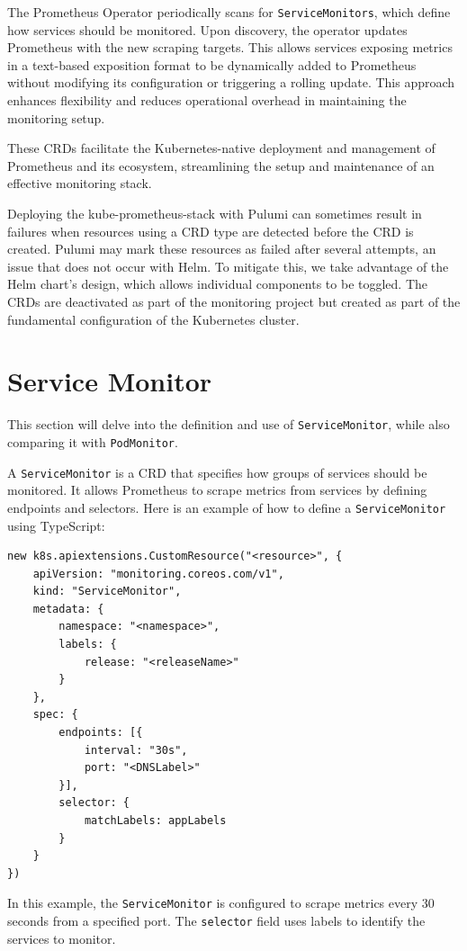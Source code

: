 The Prometheus Operator periodically scans for \texttt{ServiceMonitors}, which define how services should be monitored. Upon discovery, the operator updates Prometheus with the new scraping targets. This allows services exposing metrics in a text-based exposition format to be dynamically added to Prometheus without modifying its configuration or triggering a rolling update. This approach enhances flexibility and reduces operational overhead in maintaining the monitoring setup.

These CRDs facilitate the Kubernetes-native deployment and management of Prometheus and its ecosystem, streamlining the setup and maintenance of an effective monitoring stack.

Deploying the kube-prometheus-stack with Pulumi can sometimes result in failures when resources using a CRD type are detected before the CRD is created. Pulumi may mark these resources as failed after several attempts, an issue that does not occur with Helm. To mitigate this, we take advantage of the Helm chart's design, which allows individual components to be toggled. The CRDs are deactivated as part of the monitoring project but created as part of the fundamental configuration of the Kubernetes cluster.

\section{Service Monitor}
This section will delve into the definition and use of \texttt{ServiceMonitor}, while also comparing it with \texttt{PodMonitor}.

A \texttt{ServiceMonitor} is a CRD that specifies how groups of services should be monitored. It allows Prometheus to scrape metrics from services by defining endpoints and selectors. Here is an example of how to define a \texttt{ServiceMonitor} using TypeScript:

\begin{verbatim}
new k8s.apiextensions.CustomResource("<resource>", {
    apiVersion: "monitoring.coreos.com/v1",
    kind: "ServiceMonitor",
    metadata: {
        namespace: "<namespace>",
        labels: {
            release: "<releaseName>"
        }
    },
    spec: {
        endpoints: [{
            interval: "30s",
            port: "<DNSLabel>"
        }],
        selector: {
            matchLabels: appLabels
        }
    }
})
\end{verbatim}

In this example, the \texttt{ServiceMonitor} is configured to scrape metrics every 30 seconds from a specified port. The \texttt{selector} field uses labels to identify the services to monitor.

